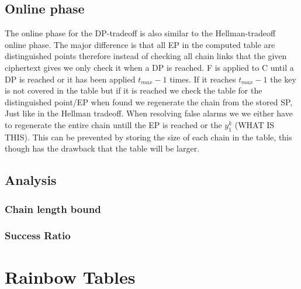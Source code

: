 \subsection{Online phase}
The online phase for the DP-tradeoff is also similar to the Hellman-tradeoff online phase. The major difference is that all EP in the computed table are distinguished points therefore instead of checking all chain links that the given ciphertext gives we only check it when a DP is reached. F is applied to C until a DP is reached or it has been applied $t_{max}-1$ times. If it reaches $t_{max}-1$ the key is not covered in the table but if it is reached we check the table for the distinguished point/EP when found we regenerate the chain from the stored SP, Just like in the Hellman tradeoff. When resolving false alarms we we either have to regenerate the entire chain untill the EP is reached or the $y^k_1$ (WHAT IS THIS). This can be prevented by storing the size of each chain in the table, this though has the drawback that the table will be larger.

\subsection{Analysis}
\subsubsection{Chain length bound}
\subsubsection{Success Ratio}
\subsubsection{}
\section{Rainbow Tables}
